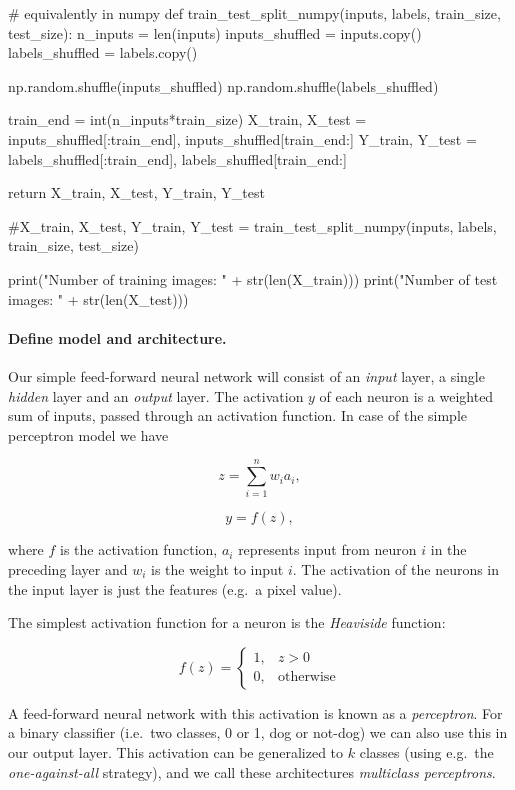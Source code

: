 \documentclass[%
oneside,                 %
final,                   %
10pt]{article}
\begin{document}
# equivalently in numpy
def train_test_split_numpy(inputs, labels, train_size, test_size):
    n_inputs = len(inputs)
    inputs_shuffled = inputs.copy()
    labels_shuffled = labels.copy()
    
    np.random.shuffle(inputs_shuffled)
    np.random.shuffle(labels_shuffled)
    
    train_end = int(n_inputs*train_size)
    X_train, X_test = inputs_shuffled[:train_end], inputs_shuffled[train_end:]
    Y_train, Y_test = labels_shuffled[:train_end], labels_shuffled[train_end:]
    
    return X_train, X_test, Y_train, Y_test

#X_train, X_test, Y_train, Y_test = train_test_split_numpy(inputs, labels, train_size, test_size)

print("Number of training images: " + str(len(X_train)))
print("Number of test images: " + str(len(X_test)))
\epycod

\paragraph{Define model and architecture.}
Our simple feed-forward neural network will consist of an \emph{input} layer, a single \emph{hidden} layer and an \emph{output} layer. The activation $y$ of each neuron is a weighted sum of inputs, passed through an activation function. In case of the simple perceptron model we have 

$$ z = \sum_{i=1}^n w_i a_i ,$$

$$ y = f(z) ,$$

where $f$ is the activation function, $a_i$ represents input from neuron $i$ in the preceding layer
and $w_i$ is the weight to input $i$.  
The activation of the neurons in the input layer is just the features (e.g.~a pixel value).  

The simplest activation function for a neuron is the \emph{Heaviside} function:

$$ f(z) = 
\begin{cases}
1,  &  z > 0\\
0,  & \text{otherwise}
\end{cases}
$$

A feed-forward neural network with this activation is known as a \emph{perceptron}.  
For a binary classifier (i.e.~two classes, 0 or 1, dog or not-dog) we can also use this in our output layer.  
This activation can be generalized to $k$ classes (using e.g.~the \emph{one-against-all} strategy), 
and we call these architectures \emph{multiclass perceptrons}.  
\end{document}
